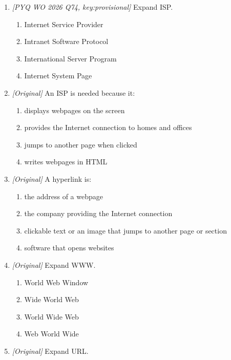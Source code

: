 \begin{enumerate}[label=\textbf{Q\arabic*.}, leftmargin=*]
\begin{enumerate}[label=\Alph*.]
    \item requests pages from a browser
    \item stores websites and sends pages to the clients that ask for them
    \item provides the Internet connection to offices
    \item finds pages matching typed keywords
  \end{enumerate}
\item \textit{[PYQ WO 2026 Q74, key:provisional]} Expand ISP.
  \begin{enumerate}[label=\Alph*.]
    \item Internet Service Provider
    \item Intranet Software Protocol
    \item International Server Program
    \item Internet System Page
  \end{enumerate}
\item \textit{[Original]} An ISP is needed because it:
  \begin{enumerate}[label=\Alph*.]
    \item displays webpages on the screen
    \item provides the Internet connection to homes and offices
    \item jumps to another page when clicked
    \item writes webpages in HTML
  \end{enumerate}
\item \textit{[Original]} A hyperlink is:
  \begin{enumerate}[label=\Alph*.]
    \item the address of a webpage
    \item the company providing the Internet connection
    \item clickable text or an image that jumps to another page or section
    \item software that opens websites
  \end{enumerate}
\item \textit{[Original]} Expand WWW.
  \begin{enumerate}[label=\Alph*.]
    \item World Web Window
    \item Wide World Web
    \item World Wide Web
    \item Web World Wide
  \end{enumerate}
\item \textit{[Original]} Expand URL.

\end{enumerate}
